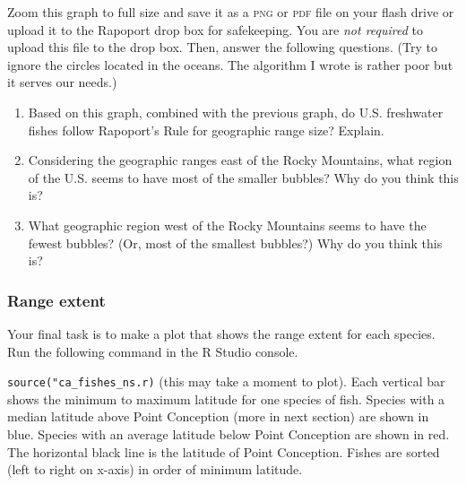 \documentclass[11pt]{article}
\begin{document}
Zoom this graph to full size and save it as a \textsc{png} or 
\textsc{pdf} file on your flash drive or upload it to the Rapoport 
drop box for safekeeping. You are \emph{not required} to upload this 
file to the drop box. Then, answer the following questions. (Try 
to ignore the circles located in the oceans. The algorithm I wrote is 
rather poor but it serves our needs.)

\begin{enumerate}[resume]
	\item Based on this graph, combined with the previous graph, do
	U.S. freshwater fishes follow Rapoport's Rule for geographic range 
	size? Explain.

	\vspace{9\baselineskip}

	\item Considering the geographic ranges east of the Rocky
	Mountains, what region of the U.S. seems to have most of the
	smaller bubbles? Why do you think this is?

	\vspace{9\baselineskip}

	\item What geographic region west of the Rocky Mountains seems to
	have the fewest bubbles? (Or, most of the smallest bubbles?) Why 
	do you think this is? 
\end{enumerate}

\subsubsection*{Range extent}

Your final task is to make a plot that shows the range extent for each species. Run the following command in the R Studio console.

\texttt{source("ca\_fishes\_ns.r)}
(this may take a moment to plot). Each vertical bar shows the minimum to maximum latitude for one species of fish. Species with a median latitude above Point Conception (more in next section) are shown in blue. Species with an average latitude below Point Conception are shown in red. The horizontal black line is the latitude of Point Conception. Fishes are sorted (left to right on x-axis) in order of minimum latitude.
\end{document}
